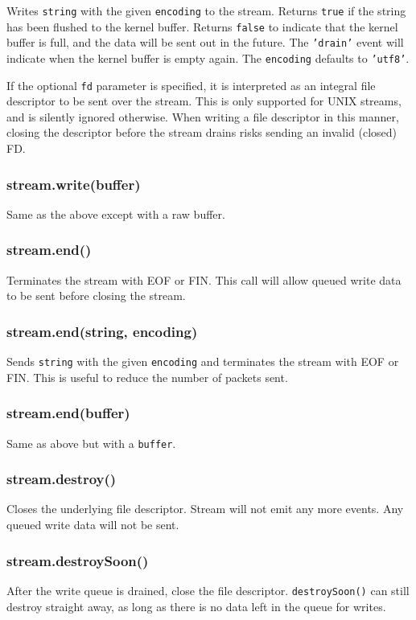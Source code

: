 Writes \texttt{string} with the given \texttt{encoding} to the stream.
Returns \texttt{true} if the string has been flushed to the kernel
buffer. Returns \texttt{false} to indicate that the kernel buffer is
full, and the data will be sent out in the future. The \texttt{'drain'}
event will indicate when the kernel buffer is empty again. The
\texttt{encoding} defaults to \texttt{'utf8'}.

If the optional \texttt{fd} parameter is specified, it is interpreted as
an integral file descriptor to be sent over the stream. This is only
supported for UNIX streams, and is silently ignored otherwise. When
writing a file descriptor in this manner, closing the descriptor before
the stream drains risks sending an invalid (closed) FD.

\subsubsection{stream.write(buffer)}

Same as the above except with a raw buffer.

\subsubsection{stream.end()}

Terminates the stream with EOF or FIN. This call will allow queued write
data to be sent before closing the stream.

\subsubsection{stream.end(string, encoding)}

Sends \texttt{string} with the given \texttt{encoding} and terminates
the stream with EOF or FIN. This is useful to reduce the number of
packets sent.

\subsubsection{stream.end(buffer)}

Same as above but with a \texttt{buffer}.

\subsubsection{stream.destroy()}

Closes the underlying file descriptor. Stream will not emit any more
events. Any queued write data will not be sent.

\subsubsection{stream.destroySoon()}

After the write queue is drained, close the file descriptor.
\texttt{destroySoon()} can still destroy straight away, as long as there
is no data left in the queue for writes.
